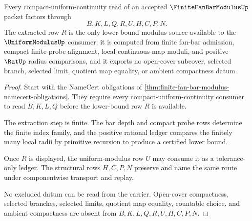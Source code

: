 \begin{theorem}
\label{thm:finite-fan-bar-lower-bound-modulus-extraction}
Every compact-uniform-continuity read of an accepted $\FiniteFanBarModulusUp$ packet factors through
$$
B,K,L,Q,R,U,H,C,P,N .
$$
The extracted row $R$ is the only lower-bound modulus source available to the $\UniformModulusUp$ consumer: it is computed from finite fan-bar admission, compact finite-probe alignment, local continuous-map moduli, and positive $\RatUp$ radius comparisons, and it exports no open-cover subcover, selected branch, selected limit, quotient map equality, or ambient compactness datum.
\end{theorem}
\begin{proof}
Start with the NameCert obligations of \autoref{thm:finite-fan-bar-modulus-namecert-obligations}. They require every compact-uniform-continuity consumer to read $B,K,L,Q$ before the lower-bound row $R$ is available.

The extraction step is finite. The bar depth and compact probe rows determine the finite index family, and the positive rational ledger compares the finitely many local radii by primitive recursion to produce a certified lower bound.

Once $R$ is displayed, the uniform-modulus row $U$ may consume it as a tolerance-only ledger. The structural rows $H,C,P,N$ preserve and name the same route under componentwise transport and replay.

No excluded datum can be read from the carrier. Open-cover compactness, selected branches, selected limits, quotient map equality, countable choice, and ambient compactness are absent from $B,K,L,Q,R,U,H,C,P,N$.
\end{proof}


\begin{closurestatus}{\FiniteFanBarModulusUp}
  \theoryclosure{\seedClosure}
  \formalstatus{\unformalizedV}
\end{closurestatus}
